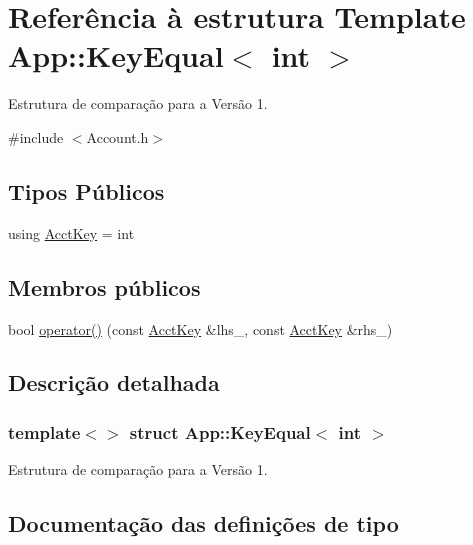 \hypertarget{structApp_1_1KeyEqual_3_01int_01_4}{}\section{Referência à estrutura Template App\+:\+:Key\+Equal$<$ int $>$}
\label{structApp_1_1KeyEqual_3_01int_01_4}


Estrutura de comparação para a Versão 1.  




{\ttfamily \#include $<$Account.\+h$>$}

\subsection*{Tipos Públicos}
\begin{DoxyCompactItemize}
\item 
using \hyperlink{structApp_1_1KeyEqual_3_01int_01_4_a118d7cd5a24685872ff596df5de9fcba}{Acct\+Key} = int
\end{DoxyCompactItemize}
\subsection*{Membros públicos}
\begin{DoxyCompactItemize}
\item 
bool \hyperlink{structApp_1_1KeyEqual_3_01int_01_4_a7cf92625e2022798c20a8e781c1765e8}{operator()} (const \hyperlink{structApp_1_1KeyEqual_3_01int_01_4_a118d7cd5a24685872ff596df5de9fcba}{Acct\+Key} \&lhs\+\_\+, const \hyperlink{structApp_1_1KeyEqual_3_01int_01_4_a118d7cd5a24685872ff596df5de9fcba}{Acct\+Key} \&rhs\+\_\+)
\end{DoxyCompactItemize}


\subsection{Descrição detalhada}
\subsubsection*{template$<$$>$\newline
struct App\+::\+Key\+Equal$<$ int $>$}

Estrutura de comparação para a Versão 1. 

\subsection{Documentação das definições de tipo}
\mbox{\label{structApp_1_1KeyEqual_3_01int_01_4_a118d7cd5a24685872ff596df5de9fcba}} 
